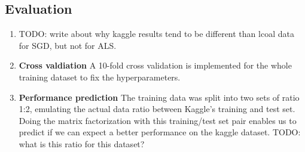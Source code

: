 

\subsection{Evaluation}

\begin{enumerate}
  \item TODO: write about why kaggle results tend to be different than lcoal data for
    SGD, but not for ALS.
  \item \textbf{Cross valdiation} A 10-fold cross validation is implemented
    for the whole training dataset to fix the hyperparameters. 

  \item \textbf{Performance prediction} The training data was split into two
    sets of ratio 1:2, emulating the actual data ratio between Kaggle's training
    and test set. Doing the matrix factorization with this training/test set
    pair enables us to predict if we can expect a better performance on the
    kaggle dataset.  
    TODO: what is this ratio for this dataset? 
\end{enumerate}


